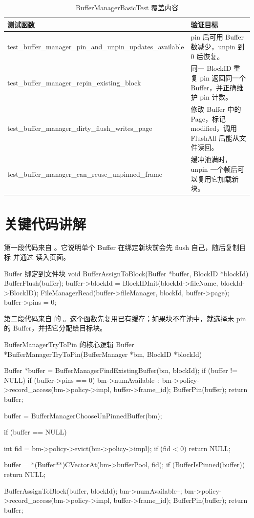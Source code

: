 \begin{table}[htbp]
  \centering
  \caption{BufferManagerBasicTest 覆盖内容}
  \label{tab:buffer-tests}
  \begin{tabularx}{\textwidth}{>{\ttfamily}l Y}
    \toprule
    测试函数 & 验证目标 \\
    \midrule
    test\_buffer\_manager\_pin\_and\_unpin\_updates\_available & pin 后可用 Buffer 数减少，unpin 到 0 后恢复。\\
    test\_buffer\_manager\_repin\_existing\_block & 同一 BlockID 重复 pin 返回同一个 Buffer，并正确维护 pin 计数。\\
    test\_buffer\_manager\_dirty\_flush\_writes\_page & 修改 Buffer 中的 Page，标记 modified，调用 FlushAll 后能从文件读回。\\
    test\_buffer\_manager\_can\_reuse\_unpinned\_frame & 缓冲池满时，unpin 一个帧后可以复用它加载新块。\\
    \bottomrule
  \end{tabularx}
\end{table}

\section{关键代码讲解}
\label{sec:buffer-code}

第一段代码来自 。它说明单个 Buffer 在绑定新块前会先 flush 自己，随后复制目标  并通过  读入页面。

\begin{dbcode}{Buffer 绑定到文件块}
void BufferAssignToBlock(Buffer *buffer, BlockID *blockId) {
    BufferFlush(buffer);
    buffer->blockId = BlockIDInit(blockId->fileName, blockId->BlockID);
    FileManagerRead(buffer->fileManager, blockId, buffer->page);
    buffer->pins = 0;
}
\end{dbcode}

第二段代码来自  的 。这个函数先复用已有缓存；如果块不在池中，就选择未 pin 的 Buffer，并把它分配给目标块。

\begin{dbcode}{BufferManagerTryToPin 的核心逻辑}
Buffer *BufferManagerTryToPin(BufferManager *bm, BlockID *blockId) {
    Buffer *buffer = BufferManagerFindExistingBuffer(bm, blockId);
    if (buffer != NULL) {
        if (buffer->pins == 0)
            bm->numAvailable--;
        bm->policy->record_access(bm->policy->impl, buffer->frame_id);
        BufferPin(buffer);
        return buffer;
    }

    buffer = BufferManagerChooseUnPinnedBuffer(bm);

    if (buffer == NULL) {
        int fid = bm->policy->evict(bm->policy->impl);
        if (fid < 0)
            return NULL;

        buffer = *(Buffer**)CVectorAt(bm->bufferPool, fid);
        if (BufferIsPinned(buffer))
            return NULL;
    }

    BufferAssignToBlock(buffer, blockId);
    bm->numAvailable--;
    bm->policy->record_access(bm->policy->impl, buffer->frame_id);
    BufferPin(buffer);
    return buffer;
}
\end{dbcode}

